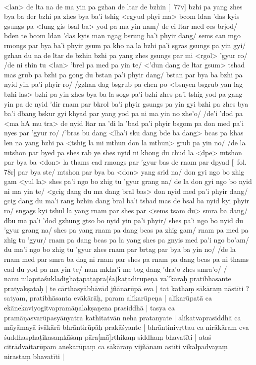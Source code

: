 \documentclass[12pt]{article}
\begin{document}
\textbf{\TVB}\\
<lan> de lta na de ma yin pa gzhan de ltar de bzhin [\TVB\ 77v] bzhi pa yang zhes bya ba der bzhi pa zhes bya ba'i tshig <rgyud phyi ma> bcom ldan 'das kyis gsungs pa <lung gis bsal ba> yod pa ma yin nam/ de ci ltar med ces brjod/ bden te bcom ldan 'das kyis man ngag bsrung ba'i phyir dang/ sems can mgo rmongs par bya ba'i phyir gsum pa kho na la bzhi pa'i sgras gsungs pa yin gyi/ gzhan du na de ltar de bzhin bzhi pa yang zhes gsungs par mi <rgol> 'gyur ro/ /de ni shin tu <lan> 'brel pa med pa yin te/ <'dun dang de ltar gsum> tshad mas grub pa bzhi pa gong du bstan pa'i phyir dang/ bstan par bya ba bzhi pa nyid yin pa'i phyir ro/ /gzhan dag bsgrub pa chen po <bsnyen bsgrub yan lag bzhi las> bzhi pa yin zhes bya ba la sogs pa'i bzhi zhes pa'i tshig yod pa gang yin pa de nyid 'dir rnam par bkrol ba'i phyir gsungs pa yin gyi bzhi pa zhes bya ba'i dbang bskur gyi khyad par yang yod pa ni ma yin no zhe'o/ /de'i 'dod pa <ma hA mu tra> de nyid ltar na 'di la 'bad pa'i phyir bsgom pa don med pa'i nyes par 'gyur ro/ /'bras bu dang <lha'i sku dang bde ba dang> bcas pa khas len na yang bzhi pa <tshig la mi mthun don la mthun> grub pa yin no/ /de la mtshon par byed pa shes rab ye shes nyid ni khong du chud la <dpe> mtshon par bya ba <don> la thams cad rmongs par 'gyur bas de rnam par dpyad [\TVB\ fol. 78r] par bya ste/ mtshon par bya ba <don> yang srid na/ don gyi ngo bo zhig gam <yul la> shes pa'i ngo bo zhig tu 'gyur grang na/ de la don gyi ngo bo nyid ni ma yin te/ <gcig dang du ma dang bral bas> don nyid med pa'i phyir dang/ gcig dang du ma'i rang bzhin dang bral ba'i tshad mas de bsal ba nyid kyi phyir ro/ sngags kyi tshul la yang rnam par shes par <sems tsam du> smra ba dang/ dbu ma pa'i 'dod gzhung gtso bo nyid yin pa'i phyir/ shes pa'i ngo bo nyid du 'gyur grang na/ shes pa yang rnam pa dang bcas pa zhig gam/ rnam pa med pa zhig tu 'gyur/ rnam pa dang bcas pa la yang shes pa gnyis med pa'i ngo bo'am/ du ma'i ngo bo zhig tu 'gyur zhes rnam par brtag par bya ba yin no/ /de la rnam med par smra ba dag ni rnam par shes pa rnam pa dang bcas pa ni thams cad du yod pa ma yin te/ nam mkha'i me tog dang 'dra'o zhes smra'o/ /\\

nanu nīlapītaśuklādighaṭapaṭapra(śa)kaṭādirūpeṇa vā''kārāḥ pratibhāsante pratyakṣataḥ | te cārthasyābhāvād jñānarūpā eva | tat kathaṃ sākāraṃ nāstīti ? satyam, pratibhāsanta evākārāḥ, param alīkarūpeṇa | alīkarūpatā ca ekānekaviyogitvapramāṇalakṣaṇena prasiddhā | tasya ca pramāṇasvarūpasyānyatra kathitatvān neha pratanyate | alīkatvaprasiddhā ca māyāmayā ivākārā bhrāntirūpāḥ prakāśyante | bhrāntinivṛttau ca nirākāram eva śuddhasphaṭikasaṃkāśaṃ pāra[mā]rthikaṃ siddhaṃ bhavatīti | ataś citrādvaitarūpam anekarūpaṃ ca sākāraṃ vijñānam astīti vikalpadvayaṃ nirastaṃ bhavatīti |\\
\end{document}
